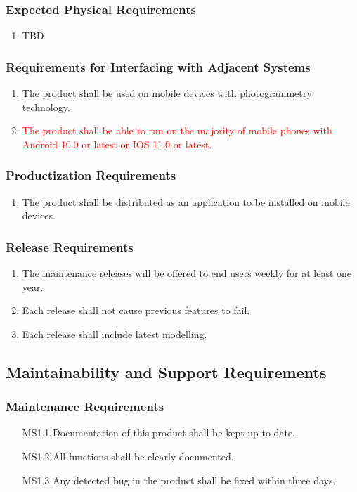 \documentclass{article}
\begin{document}
\subsubsection{Expected Physical Requirements}
\begin{enumerate}[OE1.1]
    \item TBD
\end{enumerate}
\subsubsection{Requirements for Interfacing with Adjacent Systems}
\begin{enumerate}[OE2.1]
    \item The product shall be used on mobile devices with photogrammetry technology.
    \item \textcolor{red}{The product shall be able to run on the majority of mobile phones with Android 10.0 or latest or IOS 11.0 or latest}.
\end{enumerate}
\subsubsection{Productization Requirements}
\begin{enumerate}[OE3.1]
    \item The product shall be distributed as an application to be installed on mobile devices.
\end{enumerate}
\subsubsection{Release Requirements}
\begin{enumerate}[OE4.1]
    \item The maintenance releases will be offered to end users weekly for at least one year.
    \item Each release shall not cause previous features to fail. 
    \item Each release shall include latest modelling. 
\end{enumerate}
\subsection{Maintainability and Support Requirements}
\subsubsection{Maintenance Requirements}
\begin{enumerate}
    \item[MS1.1] Documentation of this product shall be kept up to date.
    \item[MS1.2] All functions shall be clearly documented.
    \item[MS1.3] Any detected bug in the product shall be fixed within three days.
\end{enumerate}
\end{document}
